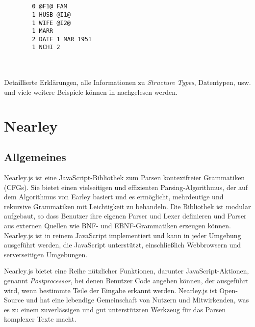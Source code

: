\\ \\
\begin{minipage}{1.0\textwidth} \small
	\begin{lstlisting}
		0 @F1@ FAM
		1 HUSB @I1@
		1 WIFE @I2@
		1 MARR
		2 DATE 1 MAR 1951
		1 NCHI 2
	\end{lstlisting}
	\label{lst: family record example}
\end{minipage}
\\ \\
Detaillierte Erklärungen, alle Informationen zu \textit{Structure Types}, Datentypen, usw. und viele weitere Beispiele können in \cite{GEDCOM} nachgelesen werden.


\section{Nearley}
\label{sec: Nearley}
\subsection*{Allgemeines}
Nearley.js ist eine JavaScript-Bibliothek zum Parsen kontextfreier Grammatiken (CFGs). Sie bietet einen vielseitigen und effizienten Parsing-Algorithmus, 
der auf dem Algorithmus von Earley basiert und es ermöglicht, mehrdeutige und rekursive Grammatiken mit Leichtigkeit zu behandeln. Die Bibliothek ist 
modular aufgebaut, so dass Benutzer ihre eigenen Parser und Lexer definieren und Parser aus externen Quellen wie BNF- und EBNF-Grammatiken erzeugen können. 
Nearley.js ist in reinem JavaScript implementiert und kann in jeder Umgebung ausgeführt werden, die JavaScript unterstützt, einschließlich Webbrowsern und 
serverseitigen Umgebungen.

Nearley.js bietet eine Reihe nützlicher Funktionen, darunter JavaScript-Aktionen, genannt \textit{Postprocessor}, bei denen Benutzer Code angeben können, 
der ausgeführt wird, wenn bestimmte Teile der Eingabe erkannt werden. Nearley.js ist Open-Source und hat eine lebendige Gemeinschaft von Nutzern und 
Mitwirkenden, was es zu einem zuverlässigen und gut unterstützten Werkzeug für das Parsen komplexer Texte macht.

